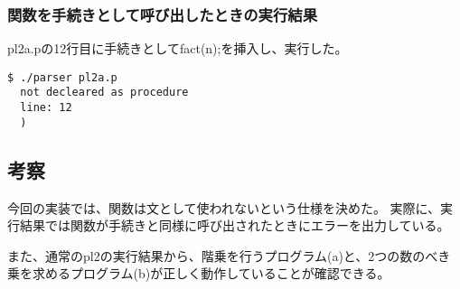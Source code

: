 \subsubsection{関数を手続きとして呼び出したときの実行結果}
pl2a.pの12行目に手続きとしてfact(n);を挿入し、実行した。
\begin{lstlisting}[caption={関数を手続きとして呼び出す},label={関数を手続きとして呼び出す}]
$ ./parser pl2a.p
  not decleared as procedure
  line: 12
  )
\end{lstlisting}

\subsection{考察}
今回の実装では、関数は文として使われないという仕様を決めた。
実際に、実行結果では関数が手続きと同様に呼び出されたときにエラーを出力している。

また、通常のpl2の実行結果から、階乗を行うプログラム(a)と、2つの数のべき乗を求めるプログラム(b)が正しく動作していることが確認できる。

